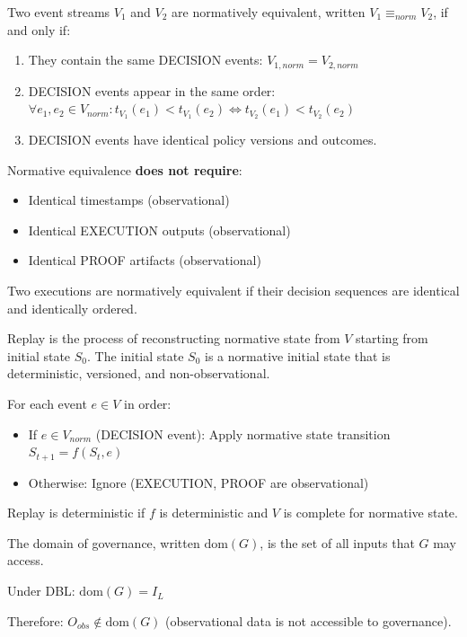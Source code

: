 \begin{definition}
Two event streams $V_1$ and $V_2$ are normatively equivalent, written $V_1 \equiv_{norm} V_2$, if and only if:

\begin{enumerate}
  \item They contain the same DECISION events: $V_{1,norm} = V_{2,norm}$
  \item DECISION events appear in the same order: $\forall e_1, e_2 \in V_{norm}: t_{V_1}(e_1) < t_{V_1}(e_2) \iff t_{V_2}(e_1) < t_{V_2}(e_2)$
  \item DECISION events have identical policy versions and outcomes.
\end{enumerate}

Normative equivalence \textbf{does not require}:
\begin{itemize}
  \item Identical timestamps (observational)
  \item Identical EXECUTION outputs (observational)
  \item Identical PROOF artifacts (observational)
\end{itemize}

Two executions are normatively equivalent if their decision sequences are identical and identically ordered.
\end{definition}

\begin{definition}[Replay]
Replay is the process of reconstructing normative state from $V$ starting from initial state $S_0$.
The initial state $S_0$ is a normative initial state that is deterministic, versioned, and non-observational.

For each event $e \in V$ in order:
\begin{itemize}
  \item If $e \in V_{norm}$ (DECISION event): Apply normative state transition $S_{t+1} = f(S_t, e)$
  \item Otherwise: Ignore (EXECUTION, PROOF are observational)
\end{itemize}

Replay is deterministic if $f$ is deterministic and $V$ is complete for normative state.
\end{definition}

\begin{definition}
The domain of governance, written $\text{dom}(G)$, is the set of all inputs that $G$ may access.

Under DBL: $\text{dom}(G) = I_L$

Therefore: $O_{obs} \not\in \text{dom}(G)$ (observational data is not accessible to governance).
\end{definition}

